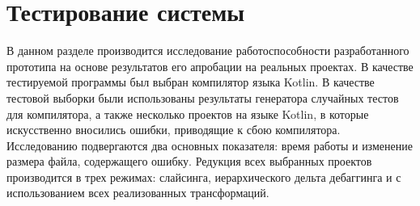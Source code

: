 \chapter{Тестирование системы}
В данном разделе производится исследование работоспособности разработанного прототипа на основе результатов его апробации на реальных проектах. В качестве тестируемой программы был выбран компилятор языка Kotlin. В качестве тестовой выборки были использованы результаты генератора случайных тестов для компилятора, а также несколько проектов на языке Kotlin, в которые искусственно вносились ошибки, приводящие к сбою компилятора. Исследованию подвергаются два основных показателя: время работы и изменение размера файла, содержащего ошибку. Редукция всех выбранных проектов производится в трех режимах: слайсинга, иерархического дельта дебаггинга и с использованием всех реализованных трансформаций.

